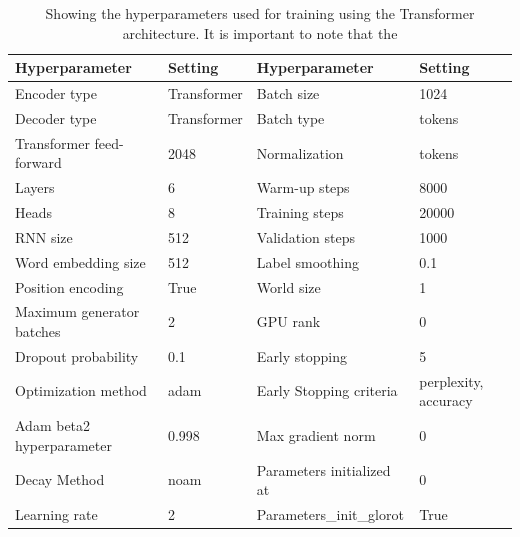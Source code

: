 \begin{table}[h]
\caption{Showing the hyperparameters used for training using the Transformer architecture. It is important to note that the  }
\centering
\begin{tabular}{|ll|ll|}
\hline
\multicolumn{1}{|l|}{Hyperparameter} & Setting     & \multicolumn{1}{l|}{Hyperparameter} & Setting              \\ \hline
Encoder type                    & Transformer & Batch size                     & 1024                 \\
Decoder type                    & Transformer & Batch type                     & tokens               \\
Transformer feed-forward        & 2048        & Normalization                  & tokens               \\
Layers                          & 6           & Warm-up steps                  & 8000                 \\
Heads                           & 8           & Training steps                 & 20000                \\
RNN size                        & 512         & Validation steps               & 1000                 \\
Word embedding size             & 512         & Label smoothing                & 0.1                  \\
Position encoding               & True        & World size                     & 1                    \\
Maximum generator batches       & 2           & GPU rank                       & 0                    \\
Dropout probability             & 0.1         & Early stopping                 & 5                    \\
Optimization method             & adam        & Early Stopping criteria        & perplexity, accuracy \\
Adam beta2 hyperparameter            & 0.998       & Max gradient norm              & 0                    \\
Decay Method                    & noam        & Parameters initialized at      & 0                    \\
Learning rate                   & 2           & Parameters\_init\_glorot       & True                 \\ \hline
\end{tabular}

\label{tab:parameter}
\end{table}

